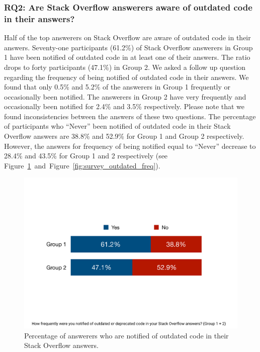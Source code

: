 \documentclass{svjour3}                     %
\begin{document}
\subsubsection*{RQ2: Are Stack Overflow answerers aware of outdated code in their answers?}

Half of the top answerers on Stack Overflow are aware of outdated code in their
answers. Seventy-one participants (61.2\%) of Stack Overflow answerers in Group
1 have been notified of outdated code in at least one of their answers. The
ratio drops to forty participants (47.1\%) in Group 2. We asked a follow up
question regarding the frequency of being notified of outdated code in their
answers. We found that only 0.5\% and 5.2\% of the answerers in Group 1
frequently or occasionally been notified. The answerers in Group 2 have very
frequently and occasionally been notified for 2.4\% and 3.5\% respectively.
Please note that we found inconsistencies between the answers of these two
questions. The percentage of participants who ``Never'' been notified of
outdated code in their Stack Overflow answers are 38.8\% and 52.9\% for Group 1
and Group 2 respectively. However, the answers for frequency of being notified
equal to ``Never'' decrease to 28.4\% and 43.5\% for Group 1 and 2 respectively
(see
Figure~\ref{fig:survey_outdated}~and~Figure~\ref{fig:survey_outdated_freq}).

\begin{figure}
	\centering
	\includegraphics[width=.5\linewidth]{survey_outdated}
	\caption{Percentage of answerers who are notified of outdated code in their Stack Overflow answers.}
	\label{fig:survey_outdated}
\end{figure}
\end{document}
